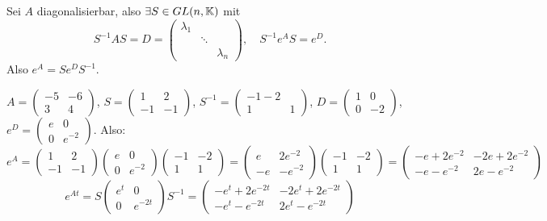 Sei $ A $ diagonalisierbar, also $ \exists S\in GL(n,\mathbb{K}) $ mit \[ S^{-1}AS=D=\begin{pmatrix}
\lambda_1\\&\ddots\\&&\lambda_n
\end{pmatrix},\quad S^{-1}e^A S=e^D. \]
Also $ e^A=Se^DS^{-1} $.
\begin{beispiel*}
	$ A=\begin{pmatrix}
	-5&-6\\3&4
	\end{pmatrix} $, $ S=\begin{pmatrix}
	1&2\\-1&-1
	\end{pmatrix} $, $ S^{-1}=\begin{pmatrix}
	-1-2\\1&1
	\end{pmatrix} $, $ D=\begin{pmatrix}
	1&0\\0&-2
	\end{pmatrix} $, $ e^D=\begin{pmatrix}
	e&0\\0&e^{-2}
	\end{pmatrix} $. Also:
	\[ e^A=\begin{pmatrix}
	1&2\\-1&-1
	\end{pmatrix}\begin{pmatrix}
	e&0\\0&e^{-2}
	\end{pmatrix}\begin{pmatrix}
	-1&-2\\1&1
	\end{pmatrix}=\begin{pmatrix}
	e&2e^{-2}\\-e&-e^{-2}
	\end{pmatrix}\begin{pmatrix}
	-1&-2\\1&1
	\end{pmatrix}=\begin{pmatrix}
	-e+2e^{-2}&-2e+2e^{-2}\\-e-e^{-2}&2e-e^{-2}
	\end{pmatrix} \]
	\[ e^{At}=S \begin{pmatrix}
	e^t&0\\0&e^{-2t}
	\end{pmatrix}S^{-1}=\begin{pmatrix}
	-e^t+2e^{-2t}&-2e^t+2e^{-2t}\\-e^t-e^{-2t}&2e^t-e^{-2t}
	\end{pmatrix} \]
\end{beispiel*}
